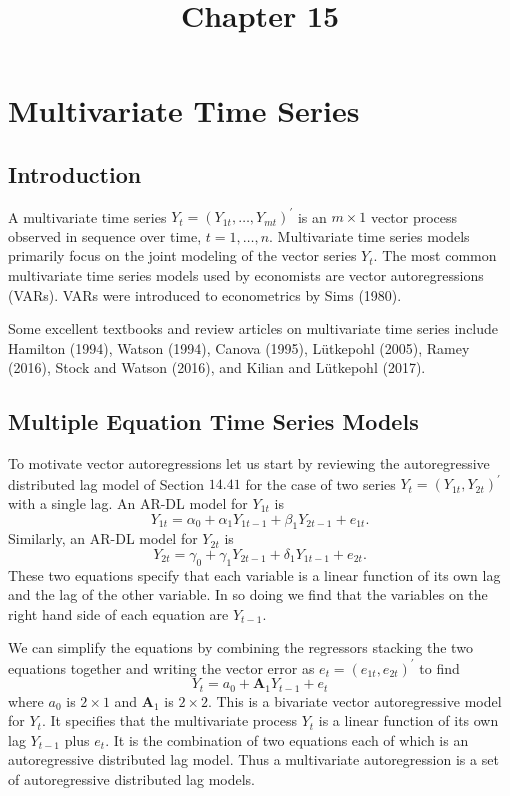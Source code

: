 \documentclass[10pt]{article}
\title{Chapter 15 }
\author{}
\date{}
\begin{document}
\maketitle
\section{Multivariate Time Series}
\subsection{Introduction}
A multivariate time series $Y_{t}=\left(Y_{1 t}, \ldots, Y_{m t}\right)^{\prime}$ is an $m \times 1$ vector process observed in sequence over time, $t=1, \ldots, n$. Multivariate time series models primarily focus on the joint modeling of the vector series $Y_{t}$. The most common multivariate time series models used by economists are vector autoregressions (VARs). VARs were introduced to econometrics by Sims (1980).

Some excellent textbooks and review articles on multivariate time series include Hamilton (1994), Watson (1994), Canova (1995), Lütkepohl (2005), Ramey (2016), Stock and Watson (2016), and Kilian and Lütkepohl (2017).

\subsection{Multiple Equation Time Series Models}
To motivate vector autoregressions let us start by reviewing the autoregressive distributed lag model of Section $14.41$ for the case of two series $Y_{t}=\left(Y_{1 t}, Y_{2 t}\right)^{\prime}$ with a single lag. An AR-DL model for $Y_{1 t}$ is
$$
Y_{1 t}=\alpha_{0}+\alpha_{1} Y_{1 t-1}+\beta_{1} Y_{2 t-1}+e_{1 t} .
$$
Similarly, an AR-DL model for $Y_{2 t}$ is
$$
Y_{2 t}=\gamma_{0}+\gamma_{1} Y_{2 t-1}+\delta_{1} Y_{1 t-1}+e_{2 t} .
$$
These two equations specify that each variable is a linear function of its own lag and the lag of the other variable. In so doing we find that the variables on the right hand side of each equation are $Y_{t-1}$.

We can simplify the equations by combining the regressors stacking the two equations together and writing the vector error as $e_{t}=\left(e_{1 t}, e_{2 t}\right)^{\prime}$ to find
$$
Y_{t}=a_{0}+\boldsymbol{A}_{1} Y_{t-1}+e_{t}
$$
where $a_{0}$ is $2 \times 1$ and $\boldsymbol{A}_{1}$ is $2 \times 2$. This is a bivariate vector autoregressive model for $Y_{t}$. It specifies that the multivariate process $Y_{t}$ is a linear function of its own lag $Y_{t-1}$ plus $e_{t}$. It is the combination of two equations each of which is an autoregressive distributed lag model. Thus a multivariate autoregression is a set of autoregressive distributed lag models.
\end{document}
